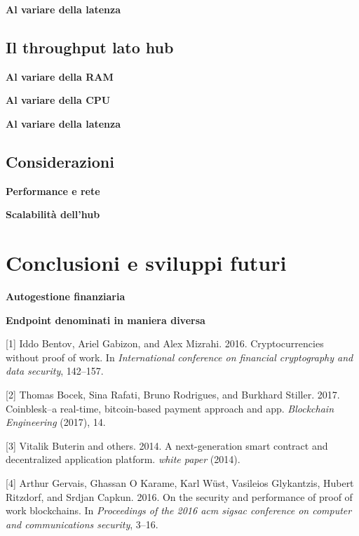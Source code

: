 \documentclass[12pt,italian,]{book}
\begin{document}
\textbf{\textbf{Al variare della latenza}}

\hypertarget{il-throughput-lato-hub}{%
\section{Il throughput lato hub}\label{il-throughput-lato-hub}}

\textbf{\textbf{Al variare della RAM}}

\textbf{\textbf{Al variare della CPU}}

\textbf{\textbf{Al variare della latenza}}

\hypertarget{considerazioni}{%
\section{Considerazioni}\label{considerazioni}}

\textbf{\textbf{Performance e rete}}

\textbf{\textbf{Scalabilità dell'hub}}

\hypertarget{conclusioni-e-sviluppi-futuri}{%
\chapter{Conclusioni e sviluppi futuri}\label{conclusioni-e-sviluppi-futuri}}

\textbf{\textbf{Autogestione finanziaria}}

\textbf{\textbf{Endpoint denominati in maniera diversa}}

\hypertarget{refs}{}
\leavevmode\hypertarget{ref-bentov2016cryptocurrencies}{}%
{[}1{]} Iddo Bentov, Ariel Gabizon, and Alex Mizrahi. 2016. Cryptocurrencies without proof of work. In \emph{International conference on financial cryptography and data security}, 142--157.

\leavevmode\hypertarget{ref-bocek2017coinblesk}{}%
{[}2{]} Thomas Bocek, Sina Rafati, Bruno Rodrigues, and Burkhard Stiller. 2017. Coinblesk--a real-time, bitcoin-based payment approach and app. \emph{Blockchain Engineering} (2017), 14.

\leavevmode\hypertarget{ref-buterin2014next}{}%
{[}3{]} Vitalik Buterin and others. 2014. A next-generation smart contract and decentralized application platform. \emph{white paper} (2014).

\leavevmode\hypertarget{ref-gervais2016security}{}%
{[}4{]} Arthur Gervais, Ghassan O Karame, Karl Wüst, Vasileios Glykantzis, Hubert Ritzdorf, and Srdjan Capkun. 2016. On the security and performance of proof of work blockchains. In \emph{Proceedings of the 2016 acm sigsac conference on computer and communications security}, 3--16.
\end{document}
